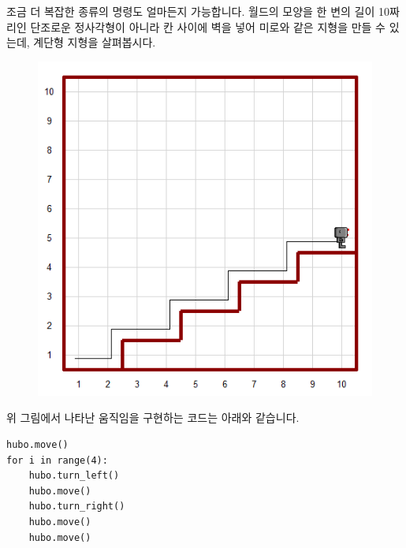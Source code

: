 \documentclass[../main.tex]{subfiles}
\begin{document}
조금 더 복잡한 종류의 명령도 얼마든지 가능합니다.
월드의 모양을 한 변의 길이 10짜리인 단조로운 정사각형이 아니라 칸 사이에 벽을 넣어 미로와 같은 지형을 만들 수 있는데, 계단형 지형을 살펴봅시다.
\begin{figure}[H]
\centering
\includegraphics[width=0.5\linewidth]{"./lectures/lecture4_hubostairs"}
\label{fig:lecture4hubostairs}
\end{figure}
위 그림에서 나타난 움직임을 구현하는 코드는 아래와 같습니다.
\begin{verbatim}
hubo.move()
for i in range(4):
	hubo.turn_left()
	hubo.move()
	hubo.turn_right()
	hubo.move()
	hubo.move()
\end{verbatim}
\end{document}
